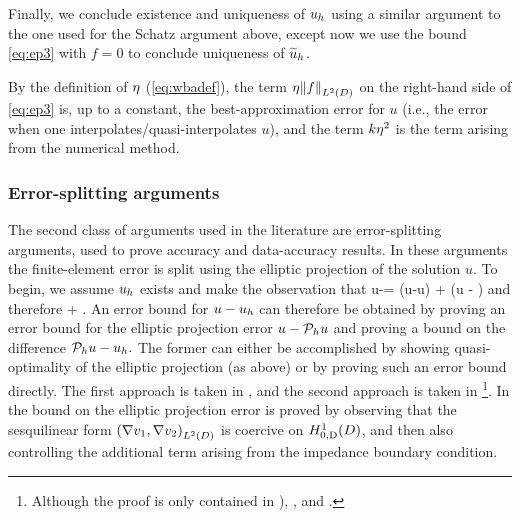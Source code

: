 Finally, we conclude existence and uniqueness of $u_{h}$ using a similar argument to the one used for the Schatz argument above, except now we use the bound \cref{eq:ep3} with $f = 0$ to conclude uniqueness of $\widetilde{u}_{h}$.

By the definition of $\eta$ (\cref{eq:wbadef}), the term $\wba\NLtD{f}$ on the right-hand side of \cref{eq:ep3} is, up to a constant, the best-approximation error for $u$ (i.e., the error when one interpolates/quasi-interpolates $u$), and the term $k\eta^2$ is the  term arising from the numerical method.%
\subsubsection{Error-splitting arguments}\label{sec:errorsplit}
The second class of arguments used in the literature are error-splitting arguments, used to prove accuracy and data-accuracy results. In these arguments the finite-element error is split using the elliptic projection of the solution $u$. To begin, we assume $u_{h}$ exists and make the observation that
\beqs\label{eq:split1}
u-\uh = \mleft(u-\Ph u\mright) + \mleft(\Ph u - \uh\mright)
\eeqs
and therefore
\beqs
{} \leq {} + .
\eeqs
An error bound for $u-u_{h}$ can therefore be obtained by proving an error bound for the elliptic projection error $u- \mathcal P_{h} u$ and proving a bound on the difference $\mathcal P_{h} u - u_{h}.$ The former can either be accomplished by showing quasi-optimality of the elliptic projection (as above) or by proving such an error bound directly. The first approach is taken in \cite{DuWu:15,ChGaNiTo:18,LiWu:19}, and the second approach is taken in \cite[Lemma 5.2]{FeWu:09}\footnote{Although the proof is only contained in \cite[Lemma 5.2]{FeWu:08}), \cite[Lemma 4.3]{FeWu:11}, and \cite[Lemma 4.2]{Wu:14}.}. In \cite{FeWu:09,FeWu:11,Wu:14} the bound on the elliptic projection error is proved by observing that the sesquilinear form $\IPLtD{\grad \vo}{\grad \vt}$ is coercive on $\HozDD$, and then also controlling the additional term arising from the impedance boundary condition.


